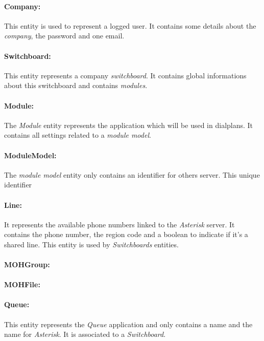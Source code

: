 \paragraph{Company:} 
This entity is used to represent a logged user. It contains some details about the \textit{company}, the password and one email.
 
\paragraph{Switchboard:}
This entity represents a company \textit{switchboard}. It contains global informations about this switchboard and contains \textit{modules}. 

\paragraph{Module:}
The \textit{Module} entity represents the application which will be used in dialplans. It contains all settings related to a \textit{module model}. 

\paragraph{ModuleModel:}
The \textit{module model} entity only contains an identifier for others server. This unique identifier 

\paragraph{Line:}
It represents the available phone numbers linked to the \textit{Asterisk} server. It contains the phone number, the region code and a boolean to indicate if it's a shared line. This entity is used by \textit{Switchboards} entities.

\paragraph{MOHGroup:}

\paragraph{MOHFile:}

\paragraph{Queue:}
This entity represents the \textit{Queue} application and only contains a name and the name for \textit{Asterisk}. It is associated to a \textit{Switchboard}.

